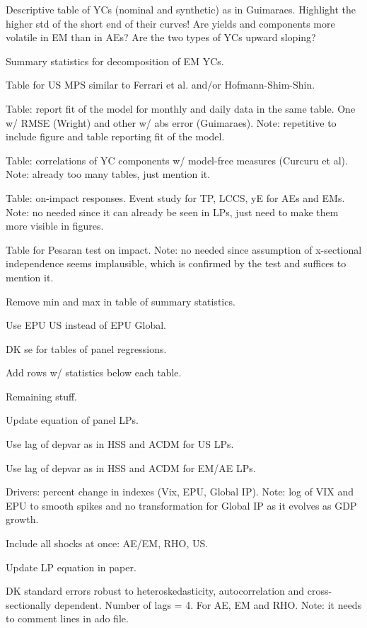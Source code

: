 \documentclass[12pt]{article}
\newcommand{\cmark}{\ding{51}}
\newcommand{\xmark}{\ding{55}}
\newcommand{\done}{\rlap{$\square$}{\raisebox{2pt}{\large\hspace{1pt}\cmark}}%
	\hspace{-2.5pt}}
\newcommand{\wontdo}{\rlap{$\square$}{\large\hspace{1pt}\xmark}}
\begin{document}
\begin{todolist}
	\begin{todolist}
		\item[\done] Descriptive table of YCs (nominal and synthetic) as in Guimaraes. Highlight the higher std of the short end of their curves! Are yields and components more volatile in EM than in AEs? Are the two types of YCs upward sloping?
		\item[\done] Summary statistics for decomposition of EM YCs.
		\item[\done] Table for US MPS similar to Ferrari et al. and/or Hofmann-Shim-Shin.
		\item[\wontdo] Table: report fit of the model for monthly and daily data in the same table. One w/ RMSE (Wright) and other w/ abs error (Guimaraes). Note: repetitive to include figure and table reporting fit of the model.
		\item[\wontdo] Table: correlations of YC components w/ model-free measures (Curcuru et al). Note: already too many tables, just mention it.
		\item[\wontdo] Table: on-impact responses. Event study for TP, LCCS, yE for AEs and EMs. Note: no needed since it can already be seen in LPs, just need to make them more visible in figures.
		\item[\wontdo] Table for Pesaran test on impact. Note: no needed since assumption of x-sectional independence seems implausible, which is confirmed by the test and suffices to mention it.
		\item[\done] Remove min and max in table of summary statistics.
		\item[\done] Use EPU US instead of EPU Global.
		\item[\done] DK se for tables of panel regressions.
		 \item[\done] Add rows w/ statistics below each table.
	\end{todolist}
	\item[\done] Remaining stuff.
	\begin{todolist}
		\item[\done] Update equation of panel LPs.
		\item[\done] Use lag of depvar as in HSS and ACDM for US LPs.
		\item[\done] Use lag of depvar as in HSS and ACDM for EM/AE LPs.
		\item[\done] Drivers: percent change in indexes (Vix, EPU, Global IP). Note: log of VIX and EPU to smooth spikes and no transformation for Global IP as it evolves as GDP growth.
		\item[\done] Include all shocks at once: AE/EM, RHO, US.
		\item[\done] Update LP equation in paper.
		\item[\done] DK standard errors robust to heteroskedasticity, autocorrelation and cross-sectionally dependent. Number of lags = 4. For AE, EM and RHO. Note: it needs to comment lines in ado file.
	\end{todolist}
	

\end{todolist}
\end{document}
